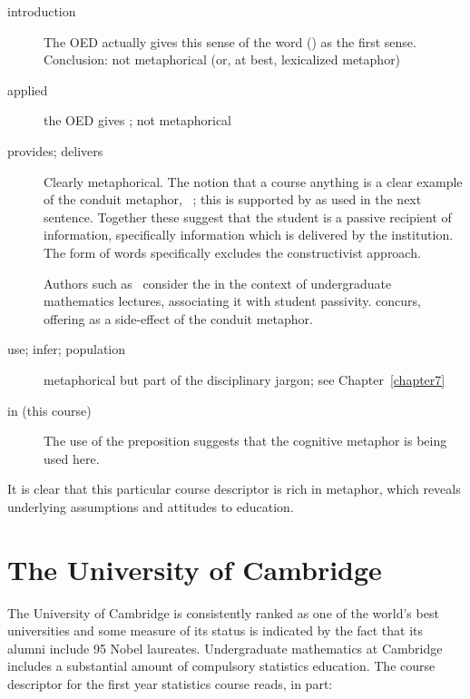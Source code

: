 \begin{description}
\item[introduction] The OED actually gives this sense of the word
  () as the first sense.
  Conclusion: not metaphorical (or, at best, lexicalized metaphor)
\item[applied] the OED gives ; not
  metaphorical
\item[provides; delivers] Clearly metaphorical.  The notion that a
  course  anything is a clear example of the
  conduit metaphor, ~\citep{reddy1993}; this is supported by
   as used in the next sentence.  Together these
  suggest that the student is a passive recipient of information,
  specifically information which is delivered by the institution.  The
  form of words specifically excludes the constructivist approach.

  Authors such as~ consider the  in the context of undergraduate mathematics lectures,
  associating it with student passivity.  
  concurs, offering  as a side-effect of the conduit metaphor.
\item[use; infer; population] metaphorical but part of the
  disciplinary jargon; see Chapter~\ref{chapter7}
\item[in (this course)] The use of the preposition 
  suggests that the cognitive metaphor 
  is being used here.
\end{description}

It is clear that this particular course descriptor is rich in
metaphor, which reveals underlying assumptions and attitudes to
education.

\section{The University of Cambridge}

The University of Cambridge is consistently ranked as one of the
world's best universities and some measure of its status is indicated
by the fact that its alumni include 95 Nobel laureates.  Undergraduate
mathematics at Cambridge includes a substantial amount of compulsory
statistics education.  The course descriptor for the first year
statistics course reads, in part:

